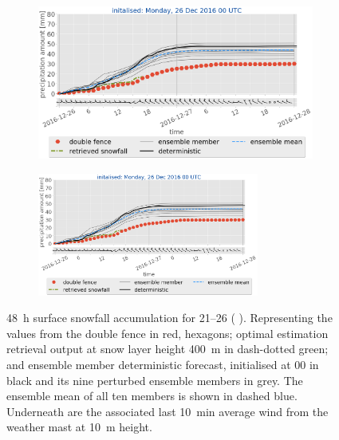 \begin{figure}[t!]
\begin{subfigure}[t]{0.49\textwidth}
		\caption{}\label{fig:sfc_acc25}
	\end{subfigure}
	\begin{subfigure}[t]{0.49\textwidth}	\includegraphics[trim={0.cm 3.6cm 0.cm 0cm},clip,width=\textwidth]{./fig_sfc_acc/acc_wind_20161226_00}
		\caption{}\label{fig:sfc_acc26}
	\end{subfigure}
	
	\begin{subfigure}[t]{\textwidth}
		\centering
		\includegraphics[trim={1.2cm 0cm 1.1cm 21.4cm},clip,width=0.8\textwidth]{./fig_sfc_acc/acc_wind_20161226_00}
	\end{subfigure}
	\caption{\SI{48}{\hour} surface snowfall accumulation for \SIrange{21}{26}{\dec} (\protect{}  \protect{}). Representing the values from the double fence in red, hexagons; optimal estimation retrieval output at snow layer height \SI{400}{\metre} in dash-dotted green; and ensemble member deterministic forecast, initialised at \SI{00}{\UTC} in black and its nine perturbed ensemble members in grey. The ensemble mean of all ten members is shown in dashed blue. Underneath are the associated last \SI{10}{\minute} average wind from the weather mast at \SI{10}{\metre} height. }\label{fig:sfc_acc}
\end{figure}

